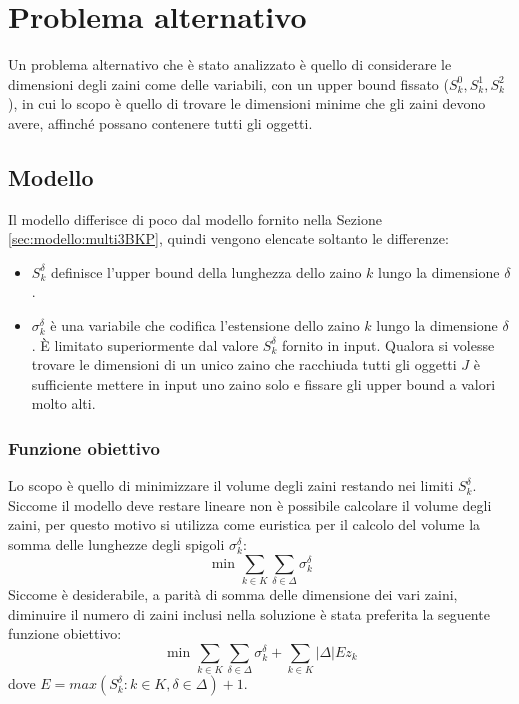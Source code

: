 \section{Problema alternativo}
\label{sec:extension2}
Un problema alternativo che è  stato analizzato è quello di considerare le 
dimensioni degli zaini come delle variabili, con un upper bound fissato 
($S_k^0, S_k^1, S_k^2$), in cui lo scopo è quello di trovare le dimensioni 
minime che gli zaini devono avere, affinché possano contenere tutti gli oggetti.

\subsection{Modello}
\label{sec:modello:hull}
Il modello differisce di poco dal modello fornito nella
Sezione \ref{sec:modello:multi3BKP}, quindi vengono elencate soltanto le 
differenze:
\begin{itemize}
	\item $S_k^\delta$ definisce l'upper bound della lunghezza dello zaino $k$ 
	lungo la dimensione $\delta$.
	
	\item $\sigma_k^\delta$ è una variabile che codifica l'estensione dello 
	zaino $k$ lungo la dimensione $\delta$. È limitato superiormente dal valore
	$S_k^\delta$ fornito in input.
	Qualora si volesse trovare le dimensioni di un unico zaino che racchiuda 
	tutti gli oggetti $J$ è sufficiente	mettere in input uno zaino solo e 
	fissare gli upper bound a valori molto alti. 
	

\end{itemize}
\subsubsection{Funzione obiettivo}
Lo scopo è quello di minimizzare il volume degli zaini restando nei limiti 
$S_k^\delta$. Siccome il modello deve restare lineare non è possibile calcolare
il volume degli zaini, per questo motivo si utilizza come euristica per il 
calcolo del volume la somma delle lunghezze degli spigoli $\sigma_k^\delta$:
\begin{equation}
\text{ min } \sum_{k \in K} \sum_{\delta \in \Delta} \sigma_k^\delta
\end{equation}
Siccome è desiderabile, a parità di somma delle dimensione dei vari zaini,
diminuire il numero di zaini inclusi nella soluzione è stata preferita la 
seguente funzione obiettivo:
\begin{equation}
\text{ min } \sum_{k \in K} \sum_{\delta \in \Delta} \sigma_k^\delta 
+ \sum_{k \in K} |\Delta| E z_k 
\end{equation}
dove $E = max(S_k^\delta : k \in K, \delta \in \Delta) + 1$.

